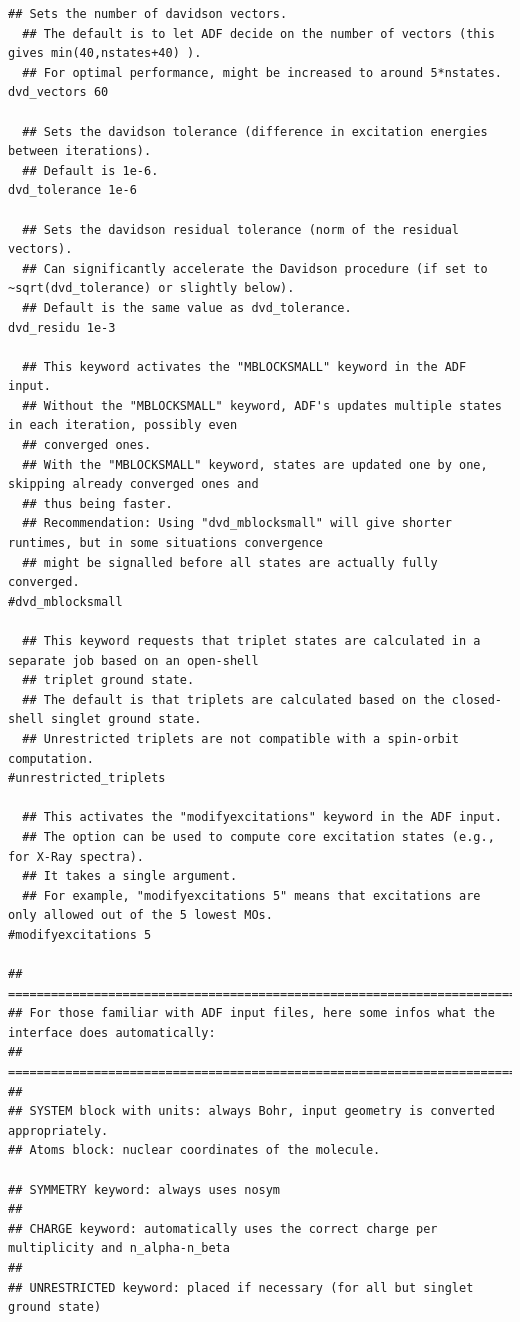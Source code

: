 \documentclass[a4paper,11pt,DIV=15,openany]{scrbook}
\begin{document}
\begin{oframed}
\begin{Verbatim}[commandchars=\\\{\}]
  ## Sets the number of davidson vectors.
  ## The default is to let ADF decide on the number of vectors (this gives min(40,nstates+40) ).
  ## For optimal performance, might be increased to around 5*nstates.
dvd_vectors 60

  ## Sets the davidson tolerance (difference in excitation energies between iterations).
  ## Default is 1e-6.
dvd_tolerance 1e-6

  ## Sets the davidson residual tolerance (norm of the residual vectors).
  ## Can significantly accelerate the Davidson procedure (if set to ~sqrt(dvd_tolerance) or slightly below).
  ## Default is the same value as dvd_tolerance.
dvd_residu 1e-3

  ## This keyword activates the "MBLOCKSMALL" keyword in the ADF input.
  ## Without the "MBLOCKSMALL" keyword, ADF's updates multiple states in each iteration, possibly even 
  ## converged ones.
  ## With the "MBLOCKSMALL" keyword, states are updated one by one, skipping already converged ones and 
  ## thus being faster.
  ## Recommendation: Using "dvd_mblocksmall" will give shorter runtimes, but in some situations convergence 
  ## might be signalled before all states are actually fully converged.
#dvd_mblocksmall

  ## This keyword requests that triplet states are calculated in a separate job based on an open-shell 
  ## triplet ground state.
  ## The default is that triplets are calculated based on the closed-shell singlet ground state.
  ## Unrestricted triplets are not compatible with a spin-orbit computation.
#unrestricted_triplets

  ## This activates the "modifyexcitations" keyword in the ADF input.
  ## The option can be used to compute core excitation states (e.g., for X-Ray spectra).
  ## It takes a single argument.
  ## For example, "modifyexcitations 5" means that excitations are only allowed out of the 5 lowest MOs.
#modifyexcitations 5

## ===============================================================================================
## For those familiar with ADF input files, here some infos what the interface does automatically:
## ===============================================================================================
##
## SYSTEM block with units: always Bohr, input geometry is converted appropriately.
## Atoms block: nuclear coordinates of the molecule.

## SYMMETRY keyword: always uses nosym
##
## CHARGE keyword: automatically uses the correct charge per multiplicity and n_alpha-n_beta
##
## UNRESTRICTED keyword: placed if necessary (for all but singlet ground state)


\end{Verbatim}
\end{oframed}
\end{document}

